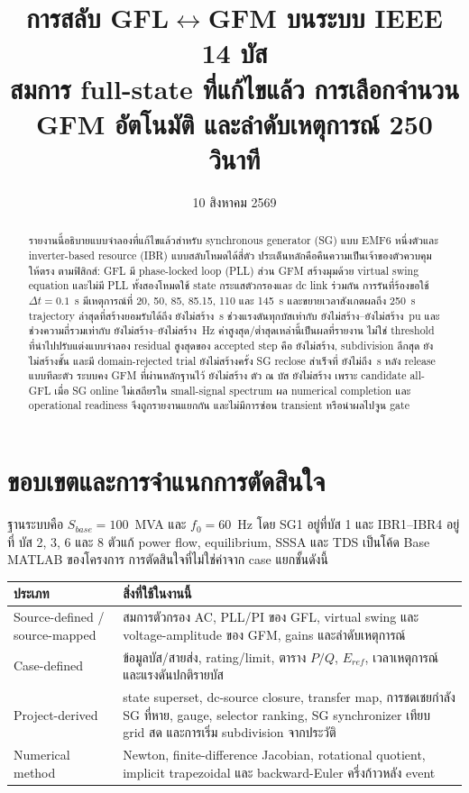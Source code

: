 \documentclass[12pt,a4paper]{article}
\title{\textbf{การสลับ GFL$\leftrightarrow$GFM บนระบบ IEEE 14 บัส}\\
\large สมการ full-state ที่แก้ไขแล้ว การเลือกจำนวน GFM อัตโนมัติ และลำดับเหตุการณ์ 250 วินาที}
\author{}
\date{10 สิงหาคม 2569}
\newcommand{\RunEnd}{ยังไม่สร้าง}
\newcommand{\RunVMin}{ยังไม่สร้าง}
\newcommand{\RunVMax}{ยังไม่สร้าง}
\newcommand{\RunFMin}{ยังไม่สร้าง}
\newcommand{\RunFMax}{ยังไม่สร้าง}
\newcommand{\RunSubdivision}{ยังไม่สร้าง}
\newcommand{\RunDomainRejects}{ยังไม่สร้าง}
\newcommand{\RunResidual}{ยังไม่สร้าง}
\newcommand{\RunReclose}{ยังไม่ถึง}
\newcommand{\RunFinalGFMCount}{ยังไม่สร้าง}
\newcommand{\RunFinalGFMBuses}{ยังไม่สร้าง}
\begin{document}
\maketitle

\begin{abstract}
รายงานนี้อธิบายแบบจำลองที่แก้ไขแล้วสำหรับ synchronous generator (SG) แบบ EMF6 หนึ่งตัวและ
inverter-based resource (IBR) แบบสลับโหมดได้สี่ตัว ประเด็นหลักคือคืนความเป็นเจ้าของตัวควบคุมให้ตรง
ตามฟิสิกส์: GFL มี phase-locked loop (PLL) ส่วน GFM สร้างมุมด้วย virtual swing equation และไม่มี PLL
ทั้งสองโหมดใช้ state กระแสตัวกรองและ dc link ร่วมกัน การรันที่ร้องขอใช้ $\Delta t=0.1$~s มีเหตุการณ์ที่
20, 50, 85, 85.15, 110 และ 145~s และขยายเวลาสังเกตผลถึง 250~s trajectory ล่าสุดที่สร้างยอมรับได้ถึง
\RunEnd~s ช่วงแรงดันทุกบัสเท่ากับ \RunVMin--\RunVMax~pu และช่วงความถี่รวมเท่ากับ
\RunFMin--\RunFMax~Hz ค่าสูงสุด/ต่ำสุดเหล่านี้เป็นผลที่รายงาน ไม่ใช่ threshold ที่นำไปปรับแต่งแบบจำลอง
residual สูงสุดของ accepted step คือ \RunResidual, subdivision ลึกสุด \RunSubdivision ชั้น และมี
domain-rejected trial \RunDomainRejects ครั้ง SG reclose สำเร็จที่ \RunReclose~s หลัง release แบบทีละตัว
ระบบคง GFM ที่ผ่านหลักฐานไว้ \RunFinalGFMCount{} ตัว ณ บัส \RunFinalGFMBuses{} เพราะ candidate all-GFL
เมื่อ SG online ไม่เสถียรใน small-signal spectrum ผล numerical completion และ operational readiness
จึงถูกรายงานแยกกัน และไม่มีการซ่อน transient หรือนำผลไปจูน gate
\end{abstract}

\tableofcontents
\newpage

\section{ขอบเขตและการจำแนกการตัดสินใจ}

ฐานระบบคือ $S_{base}=100$~MVA และ $f_0=60$~Hz โดย SG1 อยู่ที่บัส 1 และ IBR1--IBR4 อยู่ที่
บัส 2, 3, 6 และ 8 ตัวแก้ power flow, equilibrium, SSSA และ TDS เป็นโค้ด Base MATLAB ของโครงการ
การตัดสินใจที่ไม่ใช่ค่าจาก case แยกชั้นดังนี้

\begingroup\small\noindent
\begin{tabularx}{\textwidth}{@{}>{\raggedright\arraybackslash}p{}X@{}}
\toprule
ประเภท & สิ่งที่ใช้ในงานนี้ \\ \midrule
Source-defined / source-mapped & สมการตัวกรอง AC, PLL/PI ของ GFL, virtual swing และ voltage-amplitude ของ GFM, gains และลำดับเหตุการณ์ \\
Case-defined & ข้อมูลบัส/สายส่ง, rating/limit, ตาราง $P/Q$, $E_{ref}$, เวลาเหตุการณ์ และแรงดันปกติรายบัส \\
Project-derived & state superset, dc-source closure, transfer map, การชดเชยกำลัง SG ที่หาย, gauge, selector ranking, SG synchronizer เทียบ grid สด และการเริ่ม subdivision จากประวัติ \\
Numerical method & Newton, finite-difference Jacobian, rotational quotient, implicit trapezoidal และ backward-Euler ครึ่งก้าวหลัง event \\
\bottomrule
\end{tabularx}
\endgroup
\end{document}
